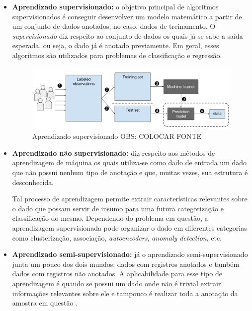 \begin{itemize}
  \item \textbf{Aprendizado supervisionado:} o objetivo principal de algoritmos supervisionados é conseguir desenvolver um modelo matemático a partir de um conjunto de dados anotados, no caso, dados de treinamento. O \textit{supervisionado} diz respeito ao conjunto de dados os quais já se sabe a saída esperada, ou seja, o dado já é anotado previamente. Em geral, esses algoritmos são utilizados para problemas de classificação e regressão.


  \begin{figure}
    \includegraphics[width=\linewidth]{figuras/nvidia-supervised-learning.png}
    \caption{Aprendizado supervisionado \color{red} OBS: COLOCAR FONTE}
    \label{fig:nvidia-supervised-learning}
  \end{figure}
  \newpage
  \item \textbf{Aprendizado não supervisionado:} diz respeito aos métodos de aprendizagem de máquina os quais utiliza-se como dado de entrada um dado que não possui nenhum tipo de anotação e que, muitas vezes, sua estrutura é desconhecida.

  Tal processo de aprendizagem permite extrair características relevantes sobre o dado que possam servir de insumo para uma futura categorização e classificação do mesmo. Dependendo do problema em questão, a aprendizagem supervisionada pode organizar o dado em diferentes categorias \cite{learning-types} como clusterização, associação, \textit{autoencoders}, \textit{anomaly detection}, etc.

  \item \textbf{Aprendizado semi-supervisionado:} já o aprendizado semi-supervisionado junta um pouco dos dois mundos: dados com registros anotados e também dados com registros não anotados. A aplicabilidade para esse tipo de aprendizagem é quando se possui um dado onde não é trivial extrair informações relevantes sobre ele e tampouco é realizar toda a anotação da amostra em questão \cite{learning-types}.
\end{itemize}

